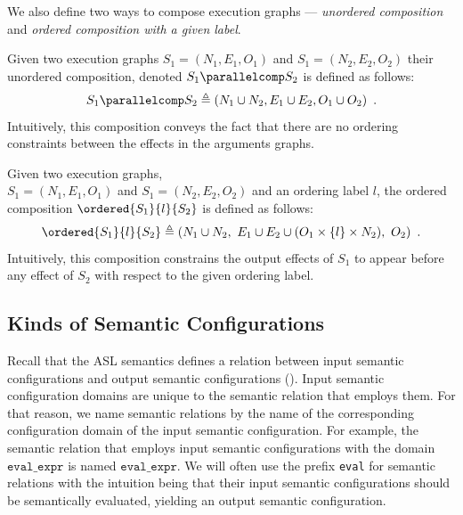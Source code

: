 We also define two ways to compose execution graphs --- \emph{unordered composition} and
\emph{ordered composition with a given label}.

\hypertarget{def-parallel}{}
\begin{definition}
Given two execution graphs $S_1 = (N_1, E_1, O_1)$ and $S_1 = (N_2, E_2, O_2)$ their unordered composition,
denoted $S_1 \parallelcomp S_2$ is defined as follows:
\[
  S_1 \parallelcomp S_2\triangleq (N_1 \cup N_2, E_1 \cup E_2, O_1 \cup O_2) \enspace.
\]
Intuitively, this composition conveys the fact that there are no ordering constraints between the effects
in the arguments graphs.
\end{definition}

\hypertarget{def-ordered}{}
\begin{definition}
Given two execution graphs, \\ $S_1 = (N_1, E_1, O_1)$ and $S_1 = (N_2, E_2, O_2)$ and an ordering label $l$,
the ordered composition $\ordered{S_1}{l}{S_2}$ is defined as follows:
\[
  \ordered{S_1}{l}{S_2} \triangleq (N_1 \cup N_2,\ E_1 \cup E_2 \cup (O_1 \times \{l\} \times N_2),\ O_2) \enspace.
\]
Intuitively, this composition constrains the output effects of $S_1$ to appear before any effect of $S_2$ with respect
to the given ordering label.
\end{definition}

\subsection{Kinds of Semantic Configurations\label{sec:KindsOfSemanticConfigurations}}

Recall that the ASL semantics defines a relation between input semantic configurations and output semantic configurations
().
Input semantic configuration domains are unique to the semantic relation that employs them.
For that reason, we name semantic relations by the name of the corresponding configuration domain of the input semantic configuration.
For example, the semantic relation that employs input semantic configurations with the domain $\texttt{eval\_expr}$
is named $\texttt{eval\_expr}$.
%
We will often use the prefix \texttt{eval} for semantic relations with the intuition being that their input semantic configurations
should be semantically evaluated, yielding an output semantic configuration.

